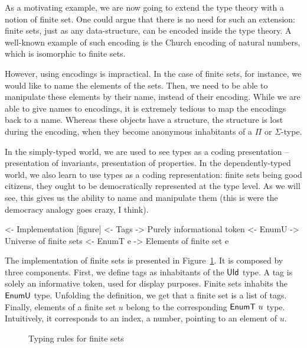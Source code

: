 As a motivating example, we are now going to extend the type theory
with a notion of finite set. One could argue that there is no need for
such an extension: finite sets, just as any data-structure, can be
encoded inside the type theory. A well-known example of such encoding
is the Church encoding of natural numbers, which is isomorphic to
finite sets. 


However, using encodings is impractical. In the case of finite sets,
for instance, we would like to name the elements of the sets. Then, we
need to be able to manipulate these elements by their name, instead of
their encoding. While we are able to give names to encodings, it is
extremely tedious to map the encodings back to a name. Whereas these
objects have a structure, the structure is lost during the encoding,
when they become anonymous inhabitants of a $Π$ or $Σ$-type.

In the simply-typed world, we are used to see types as a coding
presentation -- presentation of invariants, presentation of
properties. In the dependently-typed world, we also learn to use types
as a coding representation: finite sets being good citizens, they
ought to be democratically represented at the type level. As we will
see, this gives us the ability to name and manipulate them (this is
were the democracy analogy goes crazy, I think).

\begin{wstructure}
<- Implementation [figure]      
    <- Tags
        -> Purely informational token
    <- EnumU
        -> Universe of finite sets
    <- EnumT e
        -> Elements of finite set e
\end{wstructure}

The implementation of finite sets is presented in
Figure~\ref{fig:typing-finite-set}. It is composed by three
components. First, we define tags as inhabitants of the $\UId$ type. A
tag is solely an informative token, used for display purposes. Finite
sets inhabits the $\EnumU$ type. Unfolding the definition, we get that
a finite set is a list of tags. Finally, elements of a finite set $u$
belong to the corresponding $\EnumT{u}$ type. Intuitively, it
corresponds to an index, a number, pointing to an element of $u$.

\begin{figure}



\caption{Typing rules for finite sets}
\label{fig:typing-finite-set}

\end{figure}


